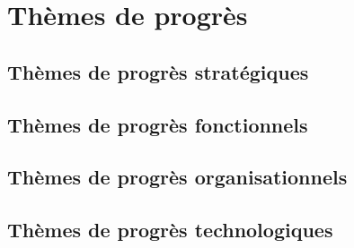 \chapter{Thèmes de progrès}

\section{Thèmes de progrès stratégiques}

\section{Thèmes de progrès fonctionnels}

\section{Thèmes de progrès organisationnels}

\section{Thèmes de progrès technologiques}


